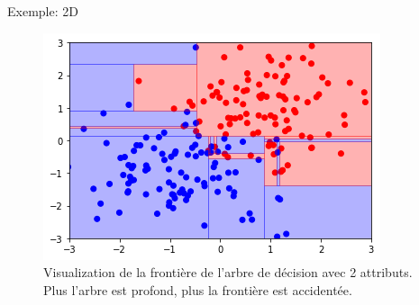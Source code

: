 \documentclass[8pt]{beamer}
\begin{document}
				\begin{frame}{Exemple: 2D}
					\begin{figure}[H]
						\includegraphics[width=.7\textwidth]{images/samples/boundary_decision_tree.png}
						\caption*{Visualization de la frontière de l'arbre de décision avec 2 attributs. Plus l'arbre est profond, plus la frontière est accidentée.}
					\end{figure}
				\end{frame}
\end{document}
